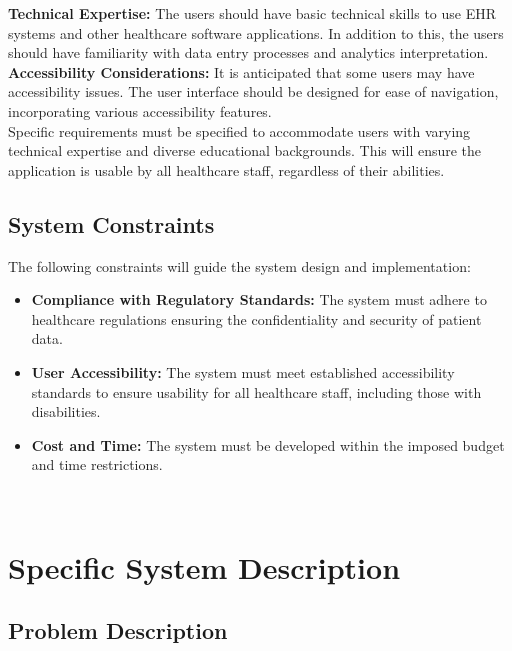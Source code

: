 \documentclass[12pt]{article}
\begin{document}
\textbf{Technical Expertise:} The users should have basic technical skills to use EHR systems and other healthcare software applications. In addition to this, the users should have familiarity with data entry processes and analytics interpretation. \\

\textbf{Accessibility Considerations:} It is anticipated that some users may have accessibility issues. The user interface should be designed for ease of navigation, incorporating various accessibility features.\\

Specific requirements must be specified to accommodate users with varying technical expertise and diverse educational backgrounds. This will ensure the application is usable by all healthcare staff, regardless of their abilities.


\subsection{System Constraints}

The following constraints will guide the system design and implementation:

\begin{itemize} 

  \item \textbf{Compliance with Regulatory Standards:} The system must adhere to healthcare regulations ensuring the confidentiality and security of patient data.

  \item \textbf{User Accessibility:} The system must meet established accessibility standards to ensure usability for all healthcare staff, including those with disabilities.

  \item \textbf{Cost and Time:} The system must be developed within the imposed budget and time restrictions.

\end{itemize}


~\newpage

\section{Specific System Description} \label{sec_SpecificSystemDescription}


\subsection{Problem Description} \label{sec_ProblemDescription}
\end{document}
